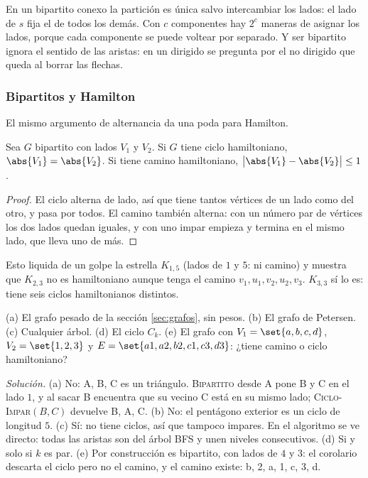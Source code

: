 \documentclass[11pt,letterpaper]{article}
\begin{document}
\begin{observacion}
  En un bipartito conexo la partición es única salvo intercambiar los
  lados: el lado de $s$ fija el de todos los demás. Con $c$
  componentes hay $2^c$ maneras de asignar los lados, porque cada
  componente se puede voltear por separado. Y ser bipartito ignora el
  sentido de las aristas: en un dirigido se pregunta por el no
  dirigido que queda al borrar las flechas.
\end{observacion}

\subsubsection*{Bipartitos y Hamilton}

El mismo argumento de alternancia da una poda para Hamilton.

\begin{corolario}
  \label{cor:bipartito-hamilton}
  Sea $G$ bipartito con lados $V_1$ y $V_2$. Si $G$ tiene ciclo
  hamiltoniano, $\abs{V_1} = \abs{V_2}$. Si tiene camino
  hamiltoniano, $\bigl| \abs{V_1} - \abs{V_2} \bigr| \le 1$.
\end{corolario}

\begin{proof}
  El ciclo alterna de lado, así que tiene tantos vértices de un lado
  como del otro, y pasa por todos. El camino también alterna: con un
  número par de vértices los dos lados quedan iguales, y con uno impar
  empieza y termina en el mismo lado, que lleva uno de más.
\end{proof}

Esto liquida de un golpe la estrella $K_{1,5}$ (lados de $1$ y $5$:
ni camino) y muestra que $K_{2,3}$ no es hamiltoniano aunque tenga el
camino $v_1, u_1, v_2, u_2, v_3$. $K_{3,3}$ sí lo es: tiene seis
ciclos hamiltonianos distintos.

\begin{ejercicio}
  \label{ej:bipartito-determine}
  (a) El grafo pesado de la sección \ref{sec:grafos}, sin pesos.
  (b) El grafo de Petersen. (c) Cualquier árbol. (d) El ciclo $C_k$.
  (e) El grafo con $V_1 = \set{a, b, c, d}$, $V_2 = \set{1, 2, 3}$ y
  $E = \set{a1, a2, b2, c1, c3, d3}$: ¿tiene camino o ciclo
  hamiltoniano?

  \textit{Solución.} (a) No: A, B, C es un triángulo.
  \textsc{Bipartito} desde A pone B y C en el lado $1$, y al sacar B
  encuentra que su vecino C está en su mismo lado;
  \textsc{Ciclo-Impar}$(B, C)$ devuelve B, A, C. (b) No: el pentágono
  exterior es un ciclo de longitud $5$. (c) Sí: no tiene ciclos, así
  que tampoco impares. En el algoritmo se ve directo: todas las
  aristas son del árbol BFS y unen niveles consecutivos. (d) Si y
  solo si $k$ es par. (e) Por construcción es bipartito, con lados de
  $4$ y $3$: el corolario descarta el ciclo pero no el camino, y el
  camino existe: b, 2, a, 1, c, 3, d.
\end{ejercicio}
\end{document}
